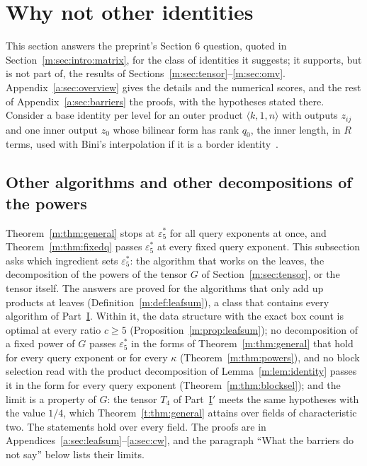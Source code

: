 \documentclass[11pt]{article}
\theoremstyle{definition}
\theoremstyle{remark}
\newcommand{\es}{\varepsilon^*_5}
\begin{document}
\section{Why not other identities}\label{m:sec:barriers}

This section answers the preprint's Section 6 question, quoted in Section~\ref{m:sec:intro:matrix}, for the class of identities it suggests; it supports, but is not part of, the results of Sections~\ref{m:sec:tensor}--\ref{m:sec:omv}. Appendix~\ref{a:sec:overview} gives the details and the numerical scores, and the rest of Appendix~\ref{a:sec:barriers} the proofs, with the hypotheses stated there. Consider a base identity per level for an outer product $\langle k,1,n\rangle$ with outputs $z_{ij}$ and one inner output $z_0$ whose bilinear form has rank $q_0$, the inner length, in $R$ terms, used with Bini's interpolation if it is a border identity~\cite{Bin80}.

\subsection{Other algorithms and other decompositions of the powers}\label{m:sec:barriers:powers}

Theorem~\ref{m:thm:general} stops at $\es$ for all query exponents at once, and Theorem~\ref{m:thm:fixedq} passes $\es$ at every fixed query exponent. This subsection asks which ingredient sets $\es$: the algorithm that works on the leaves, the decomposition of the powers of the tensor $G$ of Section~\ref{m:sec:tensor}, or the tensor itself. The answers are proved for the algorithms that only add up products at leaves (Definition~\ref{m:def:leafsum}), a class that contains every algorithm of Part~\hyperref[m:partI]{I}. Within it, the data structure with the exact box count is optimal at every ratio $c\ge5$ (Proposition~\ref{m:prop:leafsum}); no decomposition of a fixed power of $G$ passes $\es$ in the forms of Theorem~\ref{m:thm:general} that hold for every query exponent or for every $\kappa$ (Theorem~\ref{m:thm:powers}), and no block selection read with the product decomposition of Lemma~\ref{m:lem:identity} passes it in the form for every query exponent (Theorem~\ref{m:thm:blocksel}); and the limit is a property of $G$: the tensor $T_4$ of Part~\hyperref[t:partIp]{I$'$} meets the same hypotheses with the value $1/4$, which Theorem~\ref{t:thm:general} attains over fields of characteristic two. The statements hold over every field. The proofs are in Appendices~\ref{a:sec:leafsum}--\ref{a:sec:cw}, and the paragraph ``What the barriers do not say'' below lists their limits.
\end{document}
